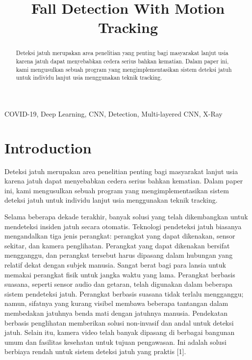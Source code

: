 \documentclass[conference]{IEEEtran}
\begin{document}
\title{Fall Detection With Motion Tracking
}

\author{
}

\maketitle

\begin{abstract}
    Deteksi jatuh merupakan area penelitian yang penting bagi masyarakat
    lanjut usia karena jatuh dapat menyebabkan cedera serius bahkan kematian.
    Dalam paper ini, kami mengusulkan sebuah program yang mengimplementasikan
    sistem deteksi jatuh untuk individu lanjut usia menggunakan teknik tracking.
\end{abstract}

\begin{IEEEkeywords}
COVID-19, Deep Learning, CNN, Detection, Multi-layered CNN, X-Ray
\end{IEEEkeywords}

\section{Introduction}
Deteksi jatuh merupakan area penelitian penting bagi masyarakat lanjut usia karena jatuh dapat menyebabkan cedera serius bahkan kematian. Dalam paper ini, kami mengusulkan sebuah program yang mengimplementasikan sistem deteksi jatuh untuk individu lanjut usia menggunakan teknik tracking.

Selama beberapa dekade terakhir, banyak solusi yang telah dikembangkan untuk mendeteksi insiden jatuh secara otomatis. Teknologi pendeteksi jatuh biasanya mengandalkan tiga jenis perangkat: perangkat yang dapat dikenakan, sensor sekitar, dan kamera penglihatan. Perangkat yang dapat dikenakan bersifat mengganggu, dan perangkat tersebut harus dipasang dalam hubungan yang relatif dekat dengan subjek manusia. Sangat berat bagi para lansia untuk memakai perangkat fisik untuk jangka waktu yang lama. Perangkat berbasis suasana, seperti sensor audio dan getaran, telah digunakan dalam beberapa sistem pendeteksi jatuh. Perangkat berbasis suasana tidak terlalu mengganggu; namun, sifatnya yang kurang visibel membawa beberapa tantangan dalam membedakan jatuhnya benda mati dengan jatuhnya manusia. Pendekatan berbasis penglihatan memberikan solusi non-invasif dan andal untuk deteksi jatuh. Selain itu, kamera video telah banyak dipasang di berbagai bangunan umum dan fasilitas kesehatan untuk tujuan pengawasan. Ini adalah solusi berbiaya rendah untuk sistem deteksi jatuh yang praktis [1].
\end{document}
